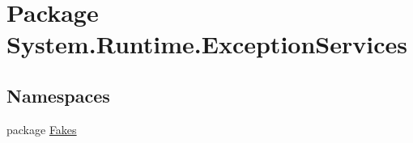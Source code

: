 \hypertarget{namespace_system_1_1_runtime_1_1_exception_services}{\section{Package System.\-Runtime.\-Exception\-Services}
\label{namespace_system_1_1_runtime_1_1_exception_services}
}
\subsection*{Namespaces}
\begin{DoxyCompactItemize}
\item 
package \hyperlink{namespace_system_1_1_runtime_1_1_exception_services_1_1_fakes}{Fakes}
\end{DoxyCompactItemize}
